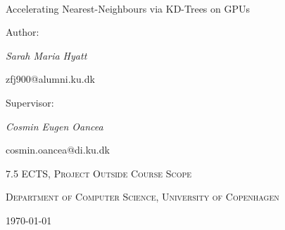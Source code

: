 \documentclass[12pt]{article}
\begin{document}
\begin{titlepage}
 \centering
 {\scshape\large ~~ \par}
 \vspace{4cm}  
 {\Huge Accelerating Nearest-Neighbours via KD-Trees on GPUs \par} %
 \vspace{2.5cm}
 {\scriptsize Author: \par}
 \vspace{0.1cm}
 {\normalsize\itshape Sarah Maria Hyatt \par}
 \vspace{0.2cm}
 {\scriptsize zfj900@alumni.ku.dk \par}
 \vspace{2cm}
 {\scriptsize Supervisor: \par}
 \vspace{0.1cm}
 {\normalsize\itshape Cosmin Eugen Oancea \par}
 \vspace{0.2cm}
 {\scriptsize cosmin.oancea@di.ku.dk \par}
 \vspace{2.5cm}
 \textsc{\small 7.5 ECTS, Project Outside Course Scope} \par
 \vspace{0.1cm}
 \textsc{\small Department of Computer Science, University of Copenhagen}\par
 \vfill
 {\small \today\par}
 \vspace{0.3cm}
\end{titlepage}

\tableofcontents


















\newpage


\end{document}
